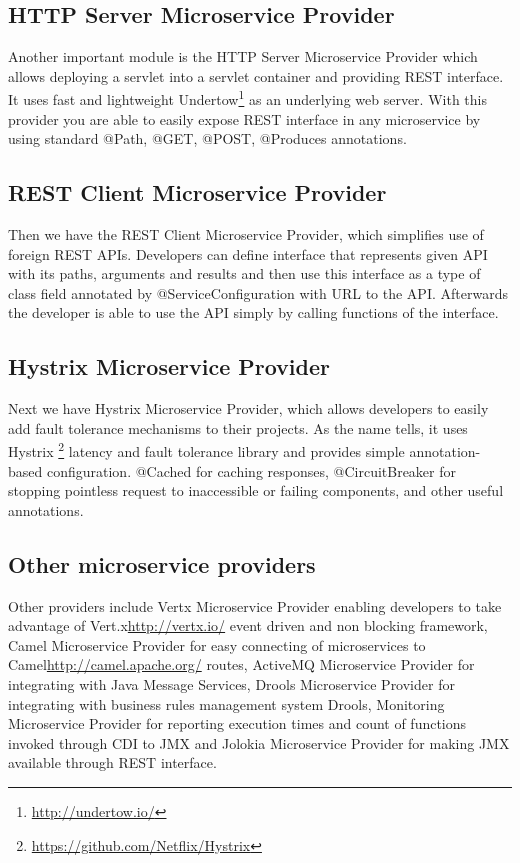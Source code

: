 \documentclass[12pt,oneside]{fithesis2}
\begin{document}
\subsection{HTTP Server Microservice Provider}
Another important module is the HTTP Server Microservice Provider which allows deploying a servlet into a servlet container and providing REST interface. It uses fast and lightweight Undertow\footnote{\url{http://undertow.io/}} as an underlying web server. With this provider you are able to easily expose REST interface in any microservice by using standard @Path, @GET, @POST, @Produces annotations.

\subsection{REST Client Microservice Provider}
Then we have the REST Client Microservice Provider, which simplifies use of foreign REST APIs. Developers can define interface that represents given API with its paths, arguments and results and then use this interface as a type of class field annotated by @ServiceConfiguration with URL to the API. Afterwards the developer is able to use the API simply by calling functions of the interface.

\subsection{Hystrix Microservice Provider}
Next we have Hystrix Microservice Provider, which allows developers to easily add fault tolerance mechanisms to their projects. As the name tells, it uses Hystrix \footnote{\url{https://github.com/Netflix/Hystrix}} latency and fault tolerance library and provides simple annotation-based configuration. @Cached for caching responses, @CircuitBreaker for stopping pointless request to inaccessible or failing components, and other useful annotations.

\subsection{Other microservice providers}
Other providers include Vertx Microservice Provider enabling developers to take advantage of Vert.x{\url{http://vertx.io/}} event driven and non blocking framework, Camel Microservice Provider for easy connecting of microservices to Camel{\url{http://camel.apache.org/}} routes, ActiveMQ Microservice Provider for integrating with Java Message Services, Drools Microservice Provider for integrating with business rules management system Drools, Monitoring Microservice Provider for reporting execution times and count of functions invoked through CDI to JMX and Jolokia Microservice Provider for making JMX available through REST interface.
\end{document}
